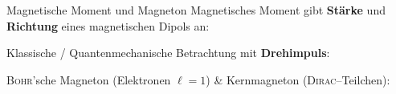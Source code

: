 \documentclass[t,9pt]{beamer}
\newcommand{\td}{\text{d}}
\begin{document}
        \begin{frame}{Magnetische Moment und Magneton}
                Magnetisches Moment gibt \textbf{Stärke} und \textbf{Richtung} eines magnetischen Dipols an:
                \begin{center}
                        \tcboxmath[colframe=white]{\boldsymbol{m}=\dfrac{1}{2}\int_{}^{}\td ^3r\left[\boldsymbol{r}\times \boldsymbol{j}\left(\boldsymbol{r}\right)\right]\qquad \boldsymbol{m}=I\cdot\boldsymbol{A}}
                \end{center}
                \pause
                Klassische / Quantenmechanische Betrachtung mit \textbf{Drehimpuls}:
                \begin{center}
                \end{center}
                \pause
                \textsc{Bohr}'sche Magneton (Elektronen $\ell=1$) \& Kernmagneton (\textsc{Dirac}--Teilchen):
                \begin{center}
                \end{center}
        \end{frame}

\end{document}
